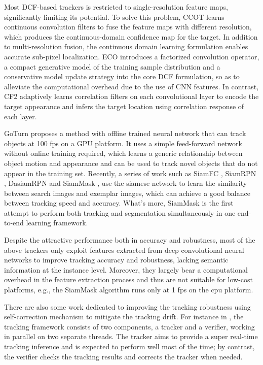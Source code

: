 \documentclass[review]{elsarticle}
\newcommand{\HL}[1]{\textcolor[rgb]{1.00,0.00,0.00}{#1}}
\begin{document}
\begin{CJK*}{UTF8}{gbsn}
Most DCF-based \HL{trackers} is restricted to single-resolution feature maps, significantly limiting its potential. To solve this problem, CCOT \cite{Danelljan2016BeyondCF} learns continuous convolution filters to fuse the feature maps with different resolution, which produces the continuous-domain confidence map for the target. In addition to multi-resolution fusion, the continuous domain learning formulation enables accurate sub-pixel localization.
ECO \cite{Danelljan2016ECOEC} introduces a factorized convolution operator, 
a compact generative model of the training sample distribution and a conservative model update strategy into the core DCF formulation, \HL{so as to alleviate the computational overhead due to the use} of CNN features.
\HL{In contrast}, CF2 \cite{Ma2015HierarchicalCF} adaptively learns correlation filters on each convolutional layer to encode the target appearance and infers the target location using correlation response of each layer.

\HL{GoTurn \cite{held2016learning} \HL{proposes} a method with offline trained neural network that can track objects \HL{at 100 fps} on a GPU platform. It uses a simple feed-forward network \HL{without} online training required, which learns a generic relationship between object motion and appearance and can be used to track novel objects that do not appear in the training set. 
Recently, a series of work such as SiamFC \cite{bertinetto2016fully}, SiamRPN \cite{Li2018HighPV},  DasiamRPN \cite{zhu2018distractor} and SiamMask \cite{Wang2018SiamMask}, use the siamese network to learn the similarity between search images and exemplar images, which can achieve a good balance between tracking speed and accuracy. What's more, SiamMask is the first attempt to perform both tracking and segmentation simultaneously in one end-to-end learning framework.}

\HL{Despite the attractive performance both in accuracy and robustness, most of the above trackers only exploit features extracted from deep convolutional neural networks to improve tracking accuracy and robustness, lacking semantic information at the instance level. Moreover, they largely bear a computational overhead in the feature extraction process and thus are not suitable for low-cost platforms, e.g., the SiamMask algorithm runs only at 1 fps on the cpu platform.}

\HL{There are also some work dedicated to improving the tracking robustness using self-correction mechanism to mitigate the tracking drift. For instance} in \cite{fan2017parallel}, the tracking framework consists of two components, a tracker and a verifier, working in parallel on two separate threads. The tracker aims to provide a super real-time tracking inference and is expected to perform well most of the time; by contrast, the verifier checks the tracking results and corrects the tracker when needed.


\end{CJK*}
\end{document}
